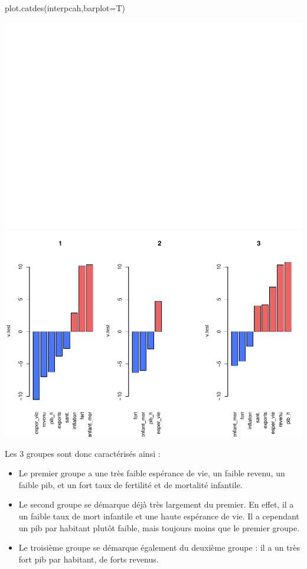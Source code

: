 \documentclass[
]{article}
\newenvironment{Shaded}{}{}
\newcommand{\AttributeTok}[1]{#1}
\newcommand{\FunctionTok}[1]{#1}
\newcommand{\NormalTok}[1]{#1}
\begin{document}
\begin{Shaded}
\begin{Highlighting}[]
\FunctionTok{plot.catdes}\NormalTok{(interpcah,}\AttributeTok{barplot=}\NormalTok{T)}
\end{Highlighting}
\end{Shaded}

\includegraphics{Projet_files/figure-latex/unnamed-chunk-26-1.pdf}
\includegraphics{Projet_files/figure-latex/unnamed-chunk-26-2.pdf}

Les 3 groupes sont donc caractérisés ainsi :

\begin{itemize}
\item
  Le premier groupe a une très faible espérance de vie, un faible
  revenu, un faible pib, et un fort taux de fertilité et de mortalité
  infantile.
\item
  Le second groupe se démarque déjà très largement du premier. En effet,
  il a un faible taux de mort infantile et une haute espérance de vie.
  Il a cependant un pib par habitant plutôt faible, mais toujours moins
  que le premier groupe.
\item
  Le troisième groupe se démarque également du deuxième groupe : il a un
  très fort pib par habitant, de forts revenus.
\end{itemize}
\end{document}
